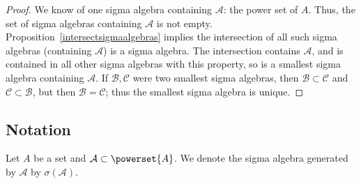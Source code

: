 \begin{proof}We know of one sigma algebra containing $\mathcal{A} $: the power set of $A$.
Thus, the set of sigma algebras containing $\mathcal{A} $ is not empty.
Proposition~\ref{intersectsigmaalgebras} implies the intersection of all such sigma algebras (containing $\mathcal{A} $) is a sigma algebra.
The intersection contains $\mathcal{A} $, and is contained in all other sigma algebras with this property, so is a smallest sigma algebra containing $\mathcal{A} $.
If $\mathcal{B} , \mathcal{C} $ were two smallest sigma algebras, then $\mathcal{B}  \subset \mathcal{C} $ and $\mathcal{C}  \subset \mathcal{B} $, but then $\mathcal{B}  = \mathcal{C} $; thus the smallest sigma algebra is unique.
\end{proof}
\subsection*{Notation}

Let $A$ be a set and $\mathcal{A}  \subset \powerset{A}$.
We denote the sigma algebra generated by $\mathcal{A} $ by $\sigma (\mathcal{A} )$.


